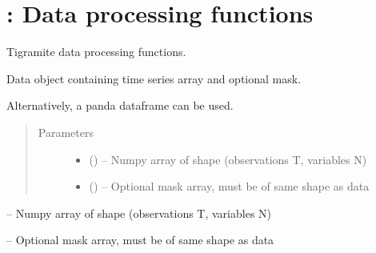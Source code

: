 \documentclass[letterpaper,10pt,english]{sphinxmanual}
\begin{document}
\chapter{: Data processing functions}
\label{\detokenize{index:tigramite-data-processing-data-processing-functions}}\label{\detokenize{index:module-tigramite.data_processing}}
Tigramite data processing functions.

\begin{fulllineitems}
\label{\detokenize{index:tigramite.data_processing.DataFrame}}
Data object containing time series array and optional mask.

Alternatively, a panda dataframe can be used.
\begin{quote}\begin{description}
\item[{Parameters}] \leavevmode\begin{itemize}
\item {} 
 () -- Numpy array of shape (observations T, variables N)

\item {} 
 (\sphinxstyleliteralemphasis{, }\sphinxstyleliteralemphasis{ (}\sphinxstyleliteralemphasis{)}\sphinxstyleliteralemphasis{}) -- Optional mask array, must be of same shape as data

\end{itemize}

\end{description}\end{quote}

\begin{fulllineitems}
\label{\detokenize{index:tigramite.data_processing.DataFrame.self.data}}
 -- Numpy array of shape (observations T, variables N)

\end{fulllineitems}


\begin{fulllineitems}
\label{\detokenize{index:tigramite.data_processing.DataFrame.mask}}
 -- Optional mask array, must be of same shape as data

\end{fulllineitems}


\end{fulllineitems}
\end{document}
